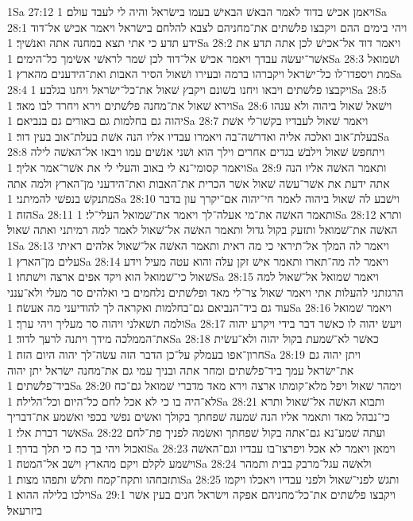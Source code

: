 1Sa 27:12  ויאמן אכישׁ בדוד לאמר הבאשׁ הבאישׁ בעמו בישׂראל והיה לי לעבד עולם׃
1Sa 28:1  ויהי בימים ההם ויקבצו פלשׁתים את־מחניהם לצבא להלחם בישׂראל ויאמר אכישׁ אל־דוד ידע תדע כי אתי תצא במחנה אתה ואנשׁיך׃
1Sa 28:2  ויאמר דוד אל־אכישׁ לכן אתה תדע את אשׁר־יעשׂה עבדך ויאמר אכישׁ אל־דוד לכן שׁמר לראשׁי אשׂימך כל־הימים׃
1Sa 28:3  ושׁמואל מת ויספדו־לו כל־ישׂראל ויקברהו ברמה ובעירו ושׁאול הסיר האבות ואת־הידענים מהארץ׃
1Sa 28:4  ויקבצו פלשׁתים ויבאו ויחנו בשׁונם ויקבץ שׁאול את־כל־ישׂראל ויחנו בגלבע׃
1Sa 28:5  וירא שׁאול את־מחנה פלשׁתים וירא ויחרד לבו מאד׃
1Sa 28:6  וישׁאל שׁאול ביהוה ולא ענהו יהוה גם בחלמות גם באורים גם בנביאם׃
1Sa 28:7  ויאמר שׁאול לעבדיו בקשׁו־לי אשׁת בעלת־אוב ואלכה אליה ואדרשׁה־בה ויאמרו עבדיו אליו הנה אשׁת בעלת־אוב בעין דור׃
1Sa 28:8  ויתחפשׂ שׁאול וילבשׁ בגדים אחרים וילך הוא ושׁני אנשׁים עמו ויבאו אל־האשׁה לילה ויאמר קסומי־נא לי באוב והעלי לי את אשׁר־אמר אליך׃
1Sa 28:9  ותאמר האשׁה אליו הנה אתה ידעת את אשׁר־עשׂה שׁאול אשׁר הכרית את־האבות ואת־הידעני מן־הארץ ולמה אתה מתנקשׁ בנפשׁי להמיתני׃
1Sa 28:10  וישׁבע לה שׁאול ביהוה לאמר חי־יהוה אם־יקרך עון בדבר הזה׃
1Sa 28:11  ותאמר האשׁה את־מי אעלה־לך ויאמר את־שׁמואל העלי־לי׃
1Sa 28:12  ותרא האשׁה את־שׁמואל ותזעק בקול גדול ותאמר האשׁה אל־שׁאול לאמר למה רמיתני ואתה שׁאול׃
1Sa 28:13  ויאמר לה המלך אל־תיראי כי מה ראית ותאמר האשׁה אל־שׁאול אלהים ראיתי עלים מן־הארץ׃
1Sa 28:14  ויאמר לה מה־תארו ותאמר אישׁ זקן עלה והוא עטה מעיל וידע שׁאול כי־שׁמואל הוא ויקד אפים ארצה וישׁתחו׃
1Sa 28:15  ויאמר שׁמואל אל־שׁאול למה הרגזתני להעלות אתי ויאמר שׁאול צר־לי מאד ופלשׁתים נלחמים בי ואלהים סר מעלי ולא־ענני עוד גם ביד־הנביאם גם־בחלמות ואקראה לך להודיעני מה אעשׂה׃
1Sa 28:16  ויאמר שׁמואל ולמה תשׁאלני ויהוה סר מעליך ויהי ערך׃
1Sa 28:17  ויעשׂ יהוה לו כאשׁר דבר בידי ויקרע יהוה את־הממלכה מידך ויתנה לרעך לדוד׃
1Sa 28:18  כאשׁר לא־שׁמעת בקול יהוה ולא־עשׂית חרון־אפו בעמלק על־כן הדבר הזה עשׂה־לך יהוה היום הזה׃
1Sa 28:19  ויתן יהוה גם את־ישׂראל עמך ביד־פלשׁתים ומחר אתה ובניך עמי גם את־מחנה ישׂראל יתן יהוה ביד־פלשׁתים׃
1Sa 28:20  וימהר שׁאול ויפל מלא־קומתו ארצה וירא מאד מדברי שׁמואל גם־כח לא־היה בו כי לא אכל לחם כל־היום וכל־הלילה׃
1Sa 28:21  ותבוא האשׁה אל־שׁאול ותרא כי־נבהל מאד ותאמר אליו הנה שׁמעה שׁפחתך בקולך ואשׂים נפשׁי בכפי ואשׁמע את־דבריך אשׁר דברת אלי׃
1Sa 28:22  ועתה שׁמע־נא גם־אתה בקול שׁפחתך ואשׂמה לפניך פת־לחם ואכול ויהי בך כח כי תלך בדרך׃
1Sa 28:23  וימאן ויאמר לא אכל ויפרצו־בו עבדיו וגם־האשׁה וישׁמע לקלם ויקם מהארץ וישׁב אל־המטה׃
1Sa 28:24  ולאשׁה עגל־מרבק בבית ותמהר ותזבחהו ותקח־קמח ותלשׁ ותפהו מצות׃
1Sa 28:25  ותגשׁ לפני־שׁאול ולפני עבדיו ויאכלו ויקמו וילכו בלילה ההוא׃
1Sa 29:1  ויקבצו פלשׁתים את־כל־מחניהם אפקה וישׂראל חנים בעין אשׁר ביזרעאל׃
